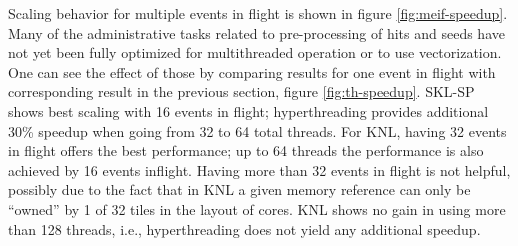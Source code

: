 \documentclass{webofc}
\begin{document}
Scaling behavior for multiple events in flight is shown in figure
\ref{fig:meif-speedup}. Many of the administrative tasks related to
pre-processing of hits and seeds have not yet been fully optimized for
multithreaded operation or to use vectorization. One can see the effect of
those by comparing results for one event in flight with corresponding result in
the previous section, figure \ref{fig:th-speedup}. SKL-SP shows best scaling with 16
events in flight; hyperthreading provides additional 30\% speedup when going from 32 to 64
total threads. For KNL, having 32 events in flight offers the best performance; up to
64 threads the performance is also achieved by 16 events inflight. Having more than
32 events in flight is not helpful, possibly due to the fact that in KNL a given
memory reference can only be ``owned'' by 1 of 32 tiles in the layout of cores.
KNL shows no gain in using more than 128 threads, i.e., hyperthreading does not
yield any additional speedup.
\end{document}
